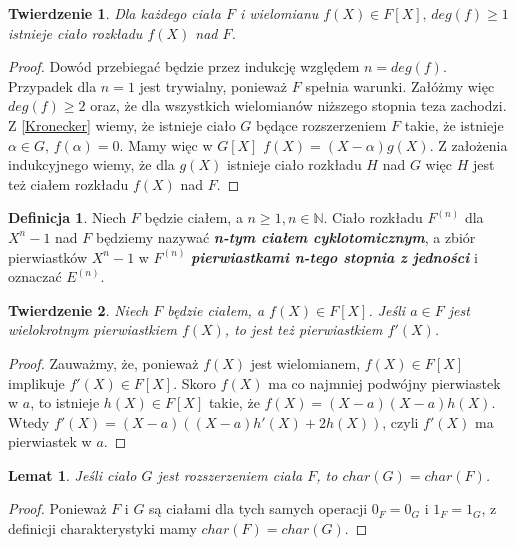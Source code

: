 \documentclass[declaration,shortabstract]{iithesis}
\theoremstyle{definition}
\newtheorem{definition}{Definicja}
\theoremstyle{remark} \newtheorem{observation}{Obserwacja}
\theoremstyle{plain} \newtheorem{theorem}{Twierdzenie}
\theoremstyle{plain} \newtheorem{lemma}{Lemat}
\theoremstyle{remark} \newtheorem*{remark*}{Uwaga}
\theoremstyle{reminder} \newtheorem*{reminder*}{Przypomnienie}
\begin{document}
	
\begin{theorem}
	Dla każdego ciała $F$ i wielomianu $f(X) \in F[X], \, deg(f) \geq 1$ istnieje ciało rozkładu $f(X)$ nad $F$.
\end{theorem}
	
\begin{proof}
	Dowód przebiegać będzie przez indukcję względem $n = deg(f)$. Przypadek dla $n = 1$ jest trywialny, ponieważ $F$ spełnia warunki. Załóżmy więc $deg(f) \geq 2$ oraz, że dla wszystkich wielomianów niższego stopnia teza zachodzi. Z \ref{Kronecker} wiemy, że istnieje ciało $G$ będące rozszerzeniem $F$ takie, że istnieje $\alpha \in G, \, f(\alpha) = 0$. Mamy więc w $G[X]$ $f(X) = (X - \alpha)g(X)$. Z założenia indukcyjnego wiemy, że dla $g(X)$ istnieje ciało rozkładu $H$ nad $G$ więc $H$ jest też ciałem rozkładu $f(X)$ nad $F$.
\end{proof}
	
\begin{definition}
	Niech $F$ będzie ciałem, a $n \geq 1, n \in \mathbb{N}$. Ciało rozkładu $F^{(n)}$ dla $X^n - 1$ nad $F$ będziemy nazywać \textit{\textbf{n-tym ciałem cyklotomicznym}}, a zbiór pierwiastków $X^n - 1$ w $F^{(n)}$ \textit{\textbf{pierwiastkami n-tego stopnia z jedności}} i oznaczać $E^{(n)}$.
\end{definition}
	
\begin{theorem} \label{mult_root}
	Niech $F$ będzie ciałem, a $f(X) \in F[X]$. Jeśli $a \in F$ jest wielokrotnym pierwiastkiem $f(X)$, to jest też pierwiastkiem $f'(X)$.
\end{theorem}
	
\begin{proof}
	Zauważmy, że, ponieważ $f(X)$ jest wielomianem, $f(X) \in F[X]$ implikuje $f'(X) \in F[X]$. Skoro $f(X)$ ma co najmniej podwójny pierwiastek w $a$, to istnieje $h(X) \in F[X]$ takie, że $f(X) = (X - a)(X - a)h(X)$. Wtedy $f'(X) = (X - a)((X - a)h'(X) + 2h(X))$, czyli $f'(X)$ ma pierwiastek w $a$.
\end{proof}
	
\begin{lemma}\label{char1}
	Jeśli ciało $G$ jest rozszerzeniem ciała $F$, to $char(G)=char(F)$.
\end{lemma}
	
\begin{proof}
	Ponieważ $F$ i $G$ są ciałami dla tych samych operacji $0_F=0_G$ i $1_F = 1_G$, z definicji charakterystyki mamy $char(F) = char(G)$.
\end{proof}
\end{document}
